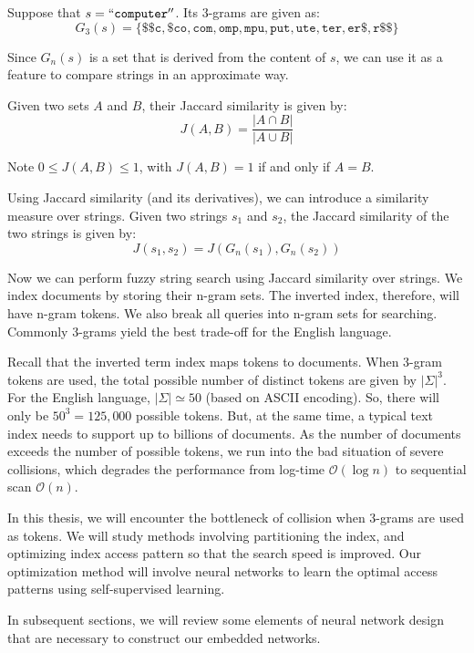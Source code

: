 \begin{example}
    Suppose that $s = \mathtt{``computer''}$.  Its 3-grams are given as:
    $$
    G_3(s) = \{
    \mathtt{\$\$c, \$co, com, omp, mpu, put, ute, ter, er\$, r\$\$}
    \}
    $$
\end{example}

Since $G_n(s)$ is a set that is derived from the content of $s$, we can
use it as a feature to compare strings in an approximate way.

\begin{definition}
    Given two sets $A$ and $B$, their Jaccard similarity
    is given by:
    $$ J(A, B) = \frac{|A\cap B|}{|A\cup B|}$$

    Note $0\leq J(A, B)\leq 1$, with $J(A, B) = 1$ if and only if $A=B$.
\end{definition}

Using Jaccard similarity (and its derivatives), we can introduce
a similarity measure over strings.  Given two strings $s_1$ and $s_2$, the Jaccard similarity of the two strings is given by:
$$ J(s_1, s_2) = J(G_n(s_1), G_n(s_2)) $$

Now we can perform fuzzy string search using Jaccard similarity over strings. We index documents by storing their n-gram sets. The inverted index, therefore, will have n-gram tokens.
We also break all queries into n-gram sets for searching. Commonly 3-grams yield the best trade-off for the English language.

Recall that the inverted term index maps tokens to documents.  When 3-gram tokens are used, the total possible number of distinct tokens are given by
$|\Sigma|^3$. For the English language, $|\Sigma|\simeq 50$ (based on ASCII encoding).  So, there will only be $50^3 = 125,000$ possible tokens.  But, at the same time, a typical text index needs to support up to billions of documents.  As the number of documents exceeds the number of possible tokens, we run into the bad situation of severe collisions, which degrades the performance
from log-time $\mathcal{O}(\log n)$ to sequential scan $\mathcal{O}(n)$.

In this thesis, we will encounter the bottleneck of collision when 3-grams are used as tokens.  We will study methods involving partitioning the index, and optimizing index access pattern so that the search speed is improved.  Our optimization method will involve neural networks to learn the optimal access patterns using self-supervised learning.

In subsequent sections, we will review some elements of neural network design that are necessary to construct our embedded networks.

